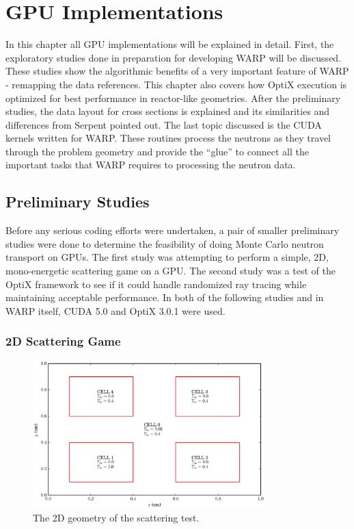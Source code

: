 \chapter{GPU Implementations}
\label{chap:imp}

In this chapter all GPU implementations will be explained in detail. 
  First, the exploratory studies done in preparation for developing WARP will be discussed.  These studies show the algorithmic benefits of a very important feature of WARP - remapping the data references.  This chapter also covers how OptiX execution is optimized for best performance in reactor-like geometries.  After the preliminary studies, the data layout for cross sections is explained and its similarities and differences from Serpent pointed out.  The last topic discussed is the CUDA kernels written for WARP.  These routines process the neutrons as they travel through the problem geometry and provide the ``glue'' to connect all the important tasks that WARP requires to processing the neutron data.

\section{Preliminary Studies}
\label{sec:prelim}

Before any serious coding efforts were undertaken, a pair of smaller preliminary studies were done to determine the feasibility of doing Monte Carlo neutron transport on GPUs.  The first study was attempting to perform a simple, 2D, mono-energetic scattering game on a GPU.  The second study was a test of the OptiX framework to see if it could handle randomized ray tracing while maintaining acceptable performance. In both of the following studies and in WARP itself, CUDA 5.0 and OptiX 3.0.1 were used.

\subsection{2D Scattering Game}

\begin{figure}[h!] 
  \centering
    \includegraphics[width=0.8\textwidth]{graphics/prelim_geom.eps}
     \caption{The 2D geometry of the scattering test. \label{prelim_geom} }
\end{figure}

